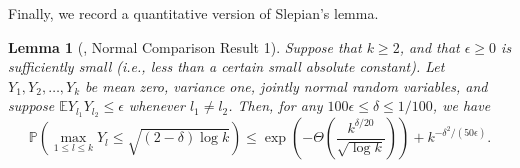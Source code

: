 \documentclass[11pt]{tran-l}
\newtheorem{lemma}[theorem]{Lemma}
\theoremstyle{definition}
\theoremstyle{remark}
\numberwithin{equation}{section}
\begin{document}
Finally, we record a quantitative version of Slepian's lemma. 

\begin{lemma}[\cite{Harper2023_ASLF}, Normal Comparison Result 1]\label{lemma:normalsBigLemma} Suppose that $k \geq 2$, and that $\epsilon \geq 0$ is sufficiently small (i.e., less than a certain small absolute constant). Let $Y_1, Y_2, \dots, Y_k$ be
mean zero, variance one, jointly normal random variables, and suppose $\mathbb EY_{l_1}Y_{l_2}\leq \epsilon$ whenever $l_1\neq l_2$. Then, for any $100\epsilon \leq \delta \leq 1/100$, we have
\[
\mathbb{P}\left(\max_{1\leq l\leq k} Y_l\leq \sqrt{(2-\delta)\log k}\right) \leq  \exp\left(-\Theta\left(\frac{k^{\delta/20}}{\sqrt{\log k}}\right)\right) + k^{-\delta^2/(50\epsilon)}.
\]
\end{lemma}
\end{document}
